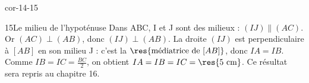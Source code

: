 \begin{blocLivre}{cor-14-15}\begin{corrige}{15}{Le milieu de l’hypoténuse}
Dans ABC, I et J sont des milieux : $(IJ)\parallel(AC)$. Or $(AC)\perp(AB)$, donc $(IJ)\perp(AB)$. La droite $(IJ)$ est perpendiculaire à $[AB]$ en son milieu J : c’est la $\res{\text{médiatrice de }[AB]}$, donc $IA=IB$. Comme $IB=IC=\frac{BC}2$, on obtient $IA=IB=IC=\res{5\ \mathrm{cm}}$. Ce résultat sera repris au chapitre 16.
\label{fig-cor-14-15}
\end{corrige}\end{blocLivre}
